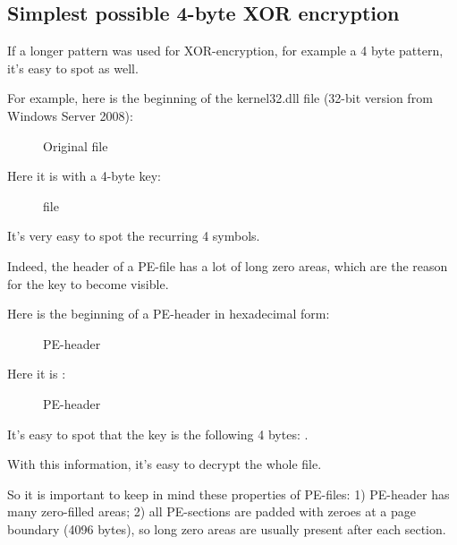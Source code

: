 \clearpage
\subsection{Simplest possible 4-byte XOR encryption}

If a longer pattern was used for XOR-encryption, for example a 4 byte pattern, it's easy to spot as well.

For example, here is the beginning of the kernel32.dll file (32-bit version from Windows Server 2008):

\begin{figure}[H]
\centering
{}
\caption{Original file}
\end{figure}

\clearpage

Here it is  with a 4-byte key:

\begin{figure}[H]
\centering
{}
\caption{ file}
\end{figure}

It's very easy to spot the recurring 4 symbols.

Indeed, the header of a PE-file has a lot of long zero areas, which are the reason for the key to become visible.

\clearpage

Here is the beginning of a PE-header in hexadecimal form:

\begin{figure}[H]
\centering
{}
\caption{PE-header}
\end{figure}

\clearpage

Here it is :

\begin{figure}[H]
\centering
{}
\caption{ PE-header}
\end{figure}

It's easy to spot that the key is the following 4 bytes: .

With this information, it's easy to decrypt the whole file.

So it is important to keep in mind these properties of PE-files:
1) PE-header has many zero-filled areas;
2) all PE-sections are padded with zeroes at a page boundary (4096 bytes),
so long zero areas are usually present after each section.

